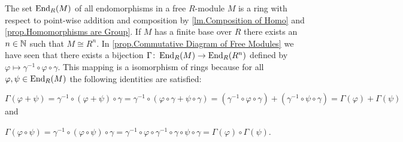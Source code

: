 \begin{rem}
The set $\operatorname{\mathrm{End}}_R(M)$ of all endomorphisms in a free $R$-mod\-ule $M$ is a ring with respect to point-wise addition and composition  by \cref{lm.Composition of Homo} and \cref{prop.Homomorphisms are Group}.
If $M$ has a finite base over $R$ there exists an $n\in\operatorname{\mathbb{N}}$ such that $M\cong R^n$. In \cref{prop.Commutative Diagram of Free Modules} we have seen that there exists a bijection $\Gamma\colon\operatorname{\mathrm{End}}_R(M)\to\operatorname{\mathrm{End}}_R(R^n)$ defined by $\varphi\mapsto\gamma^{-1}\circ\varphi\circ\gamma$.
This mapping is a isomorphism of rings because for all $\varphi,\psi\in\operatorname{\mathrm{End}}_R(M)$ the following identities are satisfied:
\begin{exlist}
\item $\Gamma(\varphi+\psi)=\gamma^{-1}\circ(\varphi+\psi)\circ\gamma =\gamma^{-1}\circ(\varphi\circ\gamma+\psi\circ\gamma)= (\gamma^{-1}\circ\varphi\circ\gamma)+(\gamma^{-1}\circ\psi\circ\gamma)=\Gamma(\varphi)+\Gamma(\psi)$ and
\item $\Gamma(\varphi\circ\psi)=\gamma^{-1}\circ(\varphi\circ\psi)\circ\gamma =\gamma^{-1}\circ\varphi\circ\gamma^{-1}\circ\gamma\circ\psi\circ\gamma =\Gamma(\varphi)\circ\Gamma(\psi)$.
\end{exlist}
\end{rem}

